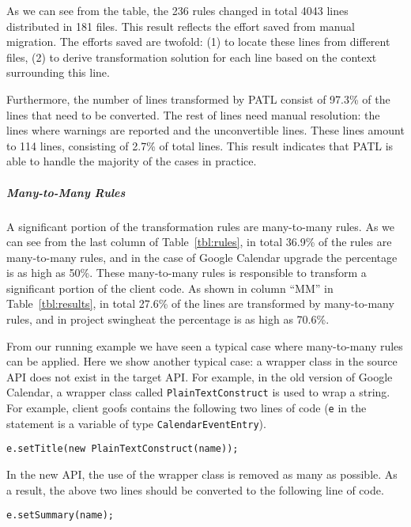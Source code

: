 \documentclass[a4paper, USenglish]{lipics-v2016}
\newenvironment{smpage}[1]
{\begin{lrbox}{\fmbox}\begin{minipage}{#1}}
{\end{minipage}\end{lrbox}\usebox{\fmbox}}
\newcommand{\code}[1]{\texttt{\footnotesize #1}}
\newcommand{\PATL}{PATL\xspace}
\theoremstyle{plain}
\begin{document}
As we can see from the table, the 236 rules changed
in total 4043 lines distributed in 181 files. This result reflects the
effort saved from manual migration. The efforts saved are twofold: (1)
to locate these lines from different files, (2) to derive
transformation solution for each line based on the context surrounding
this line.

Furthermore, the number of lines transformed by \PATL consist of
97.3\% of the lines that need to be converted. 
The rest of lines need manual resolution: the lines where warnings are
reported and the unconvertible lines. These lines amount to 114 lines,
consisting of 2.7\% of total lines. This result indicates that \PATL
is able to handle the majority of the cases in practice.

\subparagraph*{Many-to-Many Rules}
A significant portion of the transformation rules are many-to-many rules. As
we can see from the last column of Table~\ref{tbl:rules}, in total 36.9\%
of the rules are many-to-many rules, and in the case of Google
Calendar upgrade the
percentage is as high as 50\%. These many-to-many rules is responsible
to transform a significant portion of the client code. As shown in
column ``MM'' in Table~\ref{tbl:results}, in total 27.6\% of the lines
are transformed by many-to-many rules, and in project swingheat the
percentage is as high as 70.6\%. 

From our running example we have seen a typical case where
many-to-many rules can be applied. Here we show another typical case:
a wrapper class in the source API does not
exist in the target API. For example, in the old version of Google Calendar, a
wrapper class called \code{PlainTextConstruct} is used to wrap a
string. For example, client goofs contains the following two lines of code (\code{e} in the statement is a variable of type \code{CalendarEventEntry}).

\begin{center}
\begin{smpage}{0.55\columnwidth}
\begin{lstlisting}[style=java,frame=none,numbers=none]
e.setTitle(new PlainTextConstruct(name));
\end{lstlisting}
\end{smpage}
\end{center}
\vspace{-8pt}
In the new API, the use of the wrapper class is removed as many as
possible. As a result, the above two lines should be converted to the
following line of code. 
\vspace{-8pt}
\begin{center}
\begin{smpage}{0.3\columnwidth}
\begin{lstlisting}[style=java,frame=none,numbers=none]
e.setSummary(name);
\end{lstlisting}
\end{smpage}
\end{center}
\end{document}
